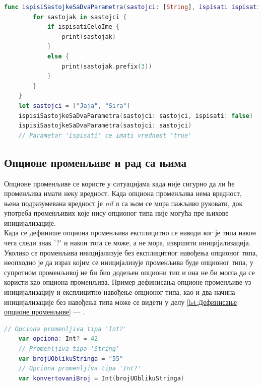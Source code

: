 \documentclass[12pt,oneside]{memoir}
\begin{document}
\begin{lstlisting}[caption=\textit{{Дефинисање и позивање функције са параметрима са подразумеваним вредностима}}, label={lst:Дефинисање и позивање функције са параметрима са подразумеваним вредностима}, language=Swift, frame=single]
    func ispisiSastojkeSaDvaParametra(sastojci: [String], ispisati ispisatiCeloIme: Bool = true) {
        for sastojak in sastojci {
            if ispisatiCeloIme {
                print(sastojak)
            }
            else {
                print(sastojak.prefix(3))
            }
        }
    }
    let sastojci = ["Jaja", "Sira"]
    ispisiSastojkeSaDvaParametra(sastojci: sastojci, ispisati: false)
    ispisiSastojkeSaDvaParametra(sastojci: sastojci)
    // Parametar 'ispisati' ce imati vrednost 'true'
\end{lstlisting}

\subsection{Опционе променљиве и рад са њима}

\indent Опционе променљиве се користе у ситуацијама када није сигурно да ли ће променљива имати неку вредност. Када опциона променљива нема вредност, њена подразумевана вредност је \textit{nil} и са њом се мора пажљиво руковати, док употреба променљивих које нису опционог типа није могућа пре њихове иницијализације.
\\
\indent Када се дефинише опциона променљива експлицитно се наводи ког је типа након чега следи знак '?' и након тога се може, а не мора, извршити иницијализација. Уколико се променљива иницијализује без експлицитног навођења опционог типа, неопходно је да израз којим се иницијализује променљива буде опционог типа, у супротном променљивој не би био додељен опциони тип и она не би могла да се користи као опциона променљива. Пример дефинисања опционе променљиве уз иницијализацију и експлицитно навођење опционог типа, као и два начина иницијализације без навођења типа може се видети у делу \ref{lst:Дефинисање опционе променљиве} --- .

\begin{lstlisting}[caption=\textit{{Дефинисање опционе променљиве}}, label={lst:Дефинисање опционе променљиве}, language=Swift, frame=single]
    // Opciona promenljiva tipa 'Int?'
    var opciona: Int? = 42
    // Promenljiva tipa 'String'
    var brojUOblikuStringa = "55"
    // Opciona promenljiva tipa 'Int?'
    var konvertovaniBroj = Int(brojUOblikuStringa)
\end{lstlisting}
\end{document}
